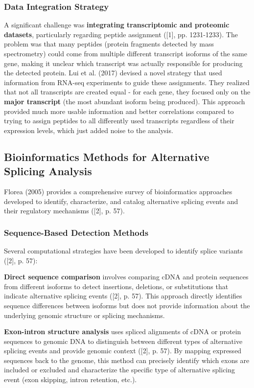 \documentclass[12pt,a4paper]{article}
\begin{document}
\subsubsection{Data Integration Strategy}

A significant challenge was \textbf{integrating transcriptomic and proteomic datasets}, particularly regarding peptide assignment ([1], pp. 1231-1233). The problem was that many peptides (protein fragments detected by mass spectrometry) could come from multiple different transcript isoforms of the same gene, making it unclear which transcript was actually responsible for producing the detected protein. Lui et al. (2017) devised a novel strategy that used information from RNA-seq experiments to guide these assignments. They realized that not all transcripts are created equal - for each gene, they focused only on the \textbf{major transcript} (the most abundant isoform being produced). This approach provided much more usable information and better correlations compared to trying to assign peptides to all differently used transcripts regardless of their expression levels, which just added noise to the analysis.

\subsection{Bioinformatics Methods for Alternative Splicing Analysis}

Florea (2005) provides a comprehensive survey of bioinformatics approaches developed to identify, characterize, and catalog alternative splicing events and their regulatory mechanisms ([2], p. 57).

\subsubsection{Sequence-Based Detection Methods}

Several computational strategies have been developed to identify splice variants ([2], p. 57):

\textbf{Direct sequence comparison} involves comparing cDNA and protein sequences from different isoforms to detect insertions, deletions, or substitutions that indicate alternative splicing events ([2], p. 57). This approach directly identifies sequence differences between isoforms but does not provide information about the underlying genomic structure or splicing mechanisms.

\textbf{Exon-intron structure analysis} uses spliced alignments of cDNA or protein sequences to genomic DNA to distinguish between different types of alternative splicing events and provide genomic context ([2], p. 57). By mapping expressed sequences back to the genome, this method can precisely identify which exons are included or excluded and characterize the specific type of alternative splicing event (exon skipping, intron retention, etc.).
\end{document}
